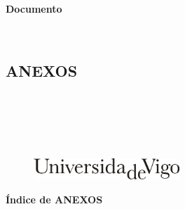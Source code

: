 \documentclass[11pt,twoside]{book}
\begin{document}
\begin{center}
\begin{normalsize}
\begin{center}
\textbf{\grado}
\end{center}
\end{normalsize}
\ \\
\ \\
\ \\
\ \\
\begin{normalsize}
\begin{center}
\textbf{Documento}
\end{center}
\end{normalsize}
\ \\
\begin{normalsize}
\begin{center}
\part{\bf{ANEXOS}}\thispagestyle{empty}
\end{center}
\end{normalsize}
\ \\
\ \\
\ \\
\ \\

\begin{center}
\begin{figure}[htbp]
\begin{center}
\includegraphics[angle=0, height=0.8cm]{images/UVIGOLogo.png}
\end{center}
\end{figure}
\end{center}

\end{center}

\cleardoublepage


\pagestyle{fancy}
\startcontents[parts]
\cleardoublepage

\begin{center}{\large \bf Índice de ANEXOS}\end{center}
\end{document}
